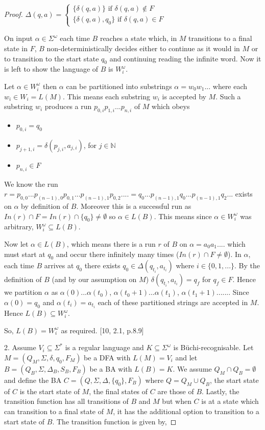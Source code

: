 \documentclass[a4paper,12pt]{report}
\theoremstyle{definition}
\begin{document}
\begin{proof}
$\Delta(q,a) = 
\begin{cases}
\{\delta(q,a)\} \text{ if } \delta(q,a)\notin F \\
\{\delta(q,a),q_0\} \text{ if } \delta(q,a)\in F
\end{cases}$

On input $\alpha\in\Sigma^\omega$ each time $B$ reaches a state which, in $M$ transitions to a final state in $F$, $B$ non-deterministically decides either to continue as it would in $M$ or to transition to the start state $q_0$ and continuing reading the infinite word. Now it is left to show the language of $B$ is $W_i^\omega$.


Let $\alpha\in W_i^\omega$ then $\alpha$ can be partitioned into substrings $\alpha=w_0w_1... $ where each $w_i \in W_i=L(M)$. This means each substring $w_i$ is accepted by $M$. Such a substring $w_i$ produces a run $p_{0,i}p_{1,i}...p_{n,i}$ of $M$ which obeys 
\begin{itemize}
\item $p_{0,i}=q_0$
\item $p_{j+1,i}=\delta(p_{j,i},a_{j,i})$, for $j\in \mathbb{N}$
\item $p_{n,i}\in F$ 
\end{itemize}

We know the run $r= p_{0,0}...p_{(n-1),0} p_{0,1}...p_{(n-1),1} p_{0,2}....= q_0...p_{(n-1),1} q_0...p_{(n-1),1} q_2...$ exists on $\alpha$ by definition of $B$. Moreover this is a successful run as $In(r) \cap F = In(r) \cap \{q_0\} \neq \emptyset$ so  $\alpha\in L(B)$. This means since $\alpha\in W_i^\omega$ was arbitrary, $W_i^\omega\subseteq L(B)$.


Now let $\alpha \in L(B)$, which means there is a run $r$ of $B$ on $\alpha=a_0a_1....$ which must start at $q_0$ and occur there infinitely many times ($In(r)\cap F \neq\emptyset$). 
In $\alpha$, each time $B$ arrives at $q_0$ there exists  $q_0\in \Delta (q_{t_i},a_{t_i})$ where $i\in\{0,1,...\}$. By the definition of $B$ (and by our assumption on $M$) $\delta(q_{t_i},a_{t_i})=q_f$ for $q_f\in F$. Hence we partition $\alpha$ as $\alpha(0)...\alpha(t_0)$, $\alpha(t_{0}+1)...\alpha(t_1)$, $\alpha(t_1+1)......$. Since $\alpha(0)=q_0$ and $\alpha(t_i)=a_{t_i}$ each of these partitioned strings are accepted in $M$. Hence $L(B)\subseteq W_i^\omega$.

So, $L(B)=W_i^\omega$ as required.
[10, 2.1, p.8.9]

2. Assume $V_i\subseteq \Sigma^*$ is a regular language and $K\subseteq \Sigma^\omega$ is Büchi-recognisable.
Let $M=(Q_M, \Sigma, \delta, q_0, F_M)$ be a DFA with $L(M)=V_i$ and let $B=(Q_B,\Sigma,\Delta_B, S_B, F_B)$ be a BA with $L(B)=K$. We assume $Q_M\cap Q_B=\emptyset$ and define the BA $C=(Q,\Sigma, \Delta, \{q_0\},F_B)$ where $Q=Q_M\cup Q_B$, the start state of $C$ is the start state of $M$, the final states of $C$ are those of $B$. Lastly, the transition function has all transitions of $B$ and $M$ but when $C$ is at a state which can transition to a final state of $M$, it has the additional option to transition to a start state of $B$. The transition function is given by,



\end{proof}
\end{document}
